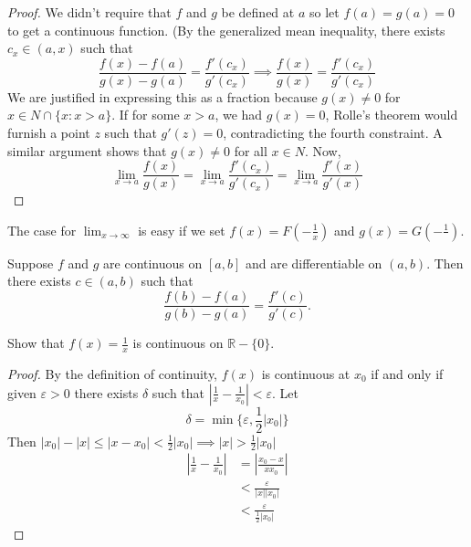 \documentclass{article}
\newcommand{\R}{\mathbb{R}}
\newcommand{\eps}{\varepsilon}
\begin{document}
\begin{proof}
  We didn't require that $f$ and $g$ be defined at $a$ so let $f(a)=g(a)=0$ to get a continuous function. (By the generalized mean inequality, there exists $c_x\in (a,x)$ such that
  $$
  \frac{f(x)-f(a)}{g(x)-g(a)}=\frac{f'(c_x)}{g'(c_x)}\implies \frac{f(x)}{g(x)}=\frac{f'(c_x)}{g'(c_x)}
  $$
  We are justified in expressing this as a fraction because $g(x)\neq 0$ for $x\in N\cap\{x:x>a\}$. If for some $x>a$, we had $g(x)=0$, Rolle's theorem would furnish a point $z$ such that $g'(z)=0$, contradicting the fourth constraint. A similar argument shows that $g(x)\neq 0$ for all $x\in N$. Now,
  $$
  \lim_{x\to a}\frac{f(x)}{g(x)}=\lim_{x\to a}\frac{f'(c_x)}{g'(c_x)}=\lim_{x\to a}\frac{f'(x)}{g'(x)}
  $$
\end{proof}
The case for $\lim_{x\to\infty}$ is easy if we set $f(x)=F(-\frac{1}{x})$ and $g(x)=G(-\frac{1}{})$.
\begin{theorem}
  Suppose $f$ and $g$ are continuous on $[a,b]$ and are differentiable on $(a,b)$. Then there exists $c\in (a,b)$ such that
  $$
  \frac{f(b)-f(a)}{g(b)-g(a)}=\frac{f'(c)}{g'(c)}.
  $$
\end{theorem}
\begin{problem}
  Show that $f(x)=\frac{1}{x}$ is continuous on $\R-\{0\}$.
\end{problem}
\begin{proof}
  By the definition of continuity, $f(x)$ is continuous at $x_0$ if and only if given $\eps>0$ there exists $\delta$ such that $|\frac{1}{x}-\frac{1}{x_0}|<\eps$. Let
  $$
  \delta = \min\{\eps,\frac{1}{2}|x_0|\}
  $$
  Then $|x_0|-|x|\leq |x-x_0|<\frac{1}{2}|x_0|\implies |x|>\frac{1}{2}|x_0|$
  \begin{equation*}
    \begin{split}
      |\frac{1}{x}-\frac{1}{x_0}| & = |\frac{x_0-x}{xx_0}|\\
      & < \frac{\eps}{|x||x_0|} \\
      & < \frac{\eps}{\frac{1}{2}|x_0|}
    \end{split}
  \end{equation*}
\end{proof}
\end{document}
